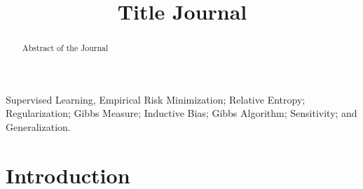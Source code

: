 \documentclass[lettersize,onecolumn]{IEEEtran}
\begin{document}
\title{Title Journal}

%
%
%
%


\maketitle

\begin{abstract}
Abstract of the Journal
\end{abstract}

\begin{IEEEkeywords}
Supervised Learning, Empirical Risk Minimization; Relative Entropy; Regularization; Gibbs Measure; Inductive Bias; Gibbs Algorithm; Sensitivity; and Generalization.
\end{IEEEkeywords}

\section{Introduction}
%
%
\end{document}
